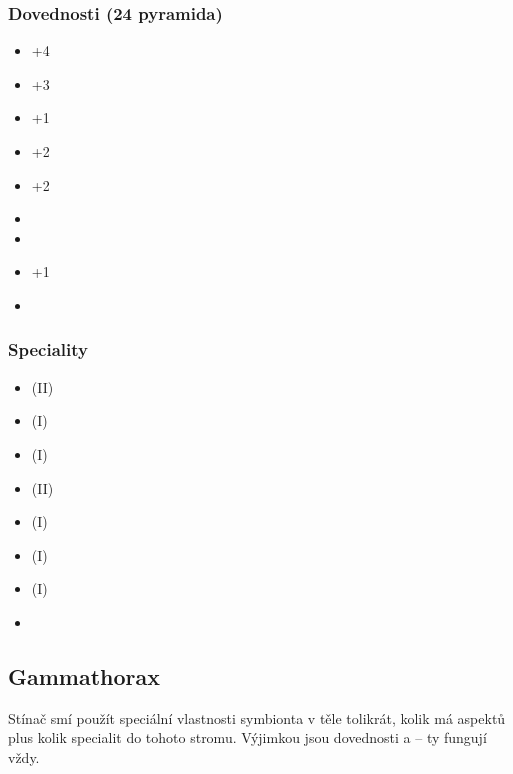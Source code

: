 \documentclass[../main.tex]{subfiles}
\begin{document}
\begin{multicols}{2}
\subsubsection*{Dovednosti (24 pyramida)}

\begin{itemize}
	\item {} +4
	\item {} +3
	\item {} +1
	\item {} +2
	\item {} +2
	\item {}
	\item {}
	\item {} +1
	\item {}
\end{itemize}

\columnbreak
\subsubsection*{Speciality}

\begin{itemize}
	\item {} (II)
	\item {} (I)
	\item {} (I)
	\item {} (II)
	\item {} (I)
	\item {} (I)
	\item {} (I)
	\item {}
\end{itemize}
\end{multicols}


\subsection{Gammathorax}
\label{sec:lopr-gamma}

Stínač smí použít speciální vlastnosti symbionta v těle tolikrát, kolik má aspektů plus kolik specialit do tohoto stromu. Výjimkou jsou dovednosti  a  – ty fungují vždy.
\end{document}
